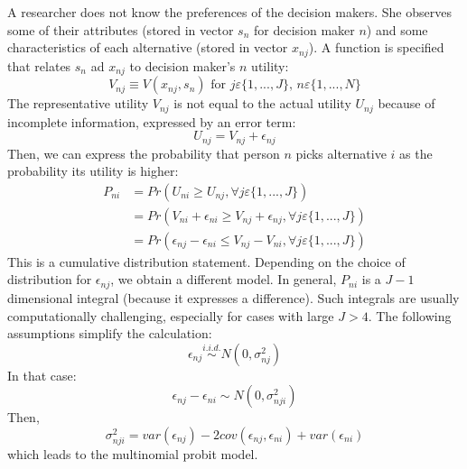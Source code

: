 			A researcher does not know the preferences of the decision makers. She observes some of their attributes (stored in vector $s_n$ for decision maker $n$) and some characteristics of each alternative (stored in vector $x_{nj}$). A function is specified that relates $s_n$ ad $x_{nj}$ to decision maker's $n$ utility:
			\begin{equation*}
				V_{nj}\equiv V(x_{nj},s_n)\text{ for }j\varepsilon\{1,...,J\},\,n\varepsilon\{1,...,N\}
			\end{equation*}
			The representative utility $V_{nj}$ is not equal to the actual utility $U_{nj}$ because of incomplete information, expressed by an error term:
			\begin{equation*}
				U_{nj}=V_{nj}+\epsilon_{nj}
			\end{equation*}
			Then, we can express the probability that person $n$ picks alternative $i$ as the probability its utility is higher:
			\begin{align*}
				P_{ni}&=Pr(U_{ni}\geq U_{nj},\forall j \varepsilon \{1,...,J\} )\\
				&=Pr(V_{ni}+\epsilon_{ni}\geq V_{nj}+\epsilon_{nj},\forall j \varepsilon \{1,...,J\} )\\
				&=Pr(\epsilon_{nj}-\epsilon_{ni}\leq V_{nj}-V_{ni},\forall j \varepsilon \{1,...,J\} )			
			\end{align*}
			This is a cumulative distribution statement. Depending on the choice of distribution for $\epsilon_{nj}$, we obtain a different model. In general, $P_{ni}$ is a $J-1$ dimensional integral (because it expresses a difference). Such integrals are usually computationally challenging, especially for cases with large $J>4$. The following assumptions simplify the calculation:
			\begin{equation}
				\epsilon_{nj} \overset{i.i.d.}{\sim} N(0,\sigma_{nj}^2)
			\end{equation}
			In that case:
			\begin{equation}
				\epsilon_{nj}-\epsilon_{ni} \sim N(0,\sigma_{nji}^2)
			\end{equation}
			Then,
			\begin{equation}
				\sigma^2_{nji}=var(\epsilon_{nj})-2cov(\epsilon_{nj}, \epsilon_{ni})+var(\epsilon_{ni})
			\end{equation}
			which leads to the multinomial probit model.
			
